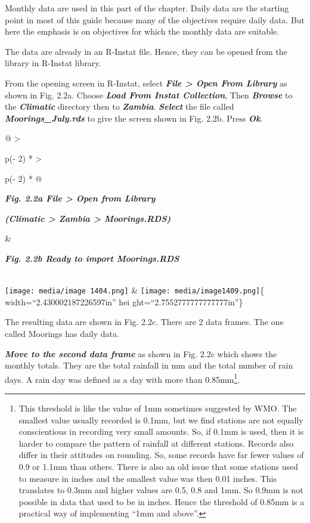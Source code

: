 \documentclass[
  letterpaper,
  DIV=11,
  numbers=noendperiod]{scrreprt}
\begin{document}
Monthly data are used in this part of the chapter. Daily data are the
starting point in most of this guide because many of the objectives
require daily data. But here the emphasis is on objectives for which the
monthly data are suitable.

The data are already in an R-Instat file. Hence, they can be opened from
the library in R-Instat library.

From the opening screen in R-Instat, select \textbf{\emph{File
\textgreater{} Open From Library}} as shown in Fig. 2.2a. Choose
\textbf{\emph{Load From Instat Collection}}, Then \textbf{\emph{Browse}}
to the \textbf{\emph{Climatic}} directory then to
\textbf{\emph{Zambia}}. \textbf{\emph{Select}} the file called
\textbf{\emph{Moorings\_July.rds}} to give the screen shown in Fig.
2.2b. Press \textbf{\emph{Ok}}.

\begin{longtable}[]{@{}
  >{\raggedright\arraybackslash}p{(\columnwidth - 2\tabcolsep) * }
  >{\raggedright\arraybackslash}p{(\columnwidth - 2\tabcolsep) * }@{}}
\toprule\noalign{}
\begin{minipage}[b]{\linewidth}\raggedright
\textbf{\emph{Fig. 2.2a File \textgreater{} Open from Library}}

\textbf{\emph{(Climatic \textgreater{} Zambia \textgreater{}
Moorings.RDS)}}
\end{minipage} & \begin{minipage}[b]{\linewidth}\raggedright
\textbf{\emph{Fig. 2.2b Ready to import Moorings.RDS}}
\end{minipage} \\
\midrule\noalign{}
\endhead
\bottomrule\noalign{}
\endlastfoot
\texttt{[image: media/image 1404.png]}
& \texttt{[image: media/image1409.png]}\{ width=``2.430002187226597in''
hei ght=``2.7552777777777777in''\} \\
\end{longtable}

The resulting data are shown in Fig. 2.2c. There are 2 data frames. The
one called Moorings has daily data.

\textbf{\emph{Move to the second data frame}} as shown in Fig. 2.2c
which shows the monthly totals. They are the total rainfall in mm and
the total number of rain days. A rain day was defined as a day with more
than 0.85mm\footnote{This threshold is like the value of 1mm sometimes
  suggested by WMO. The smallest value usually recorded is 0.1mm, but we
  find stations are not equally conscientious in recording very small
  amounts. So, if 0.1mm is used, then it is harder to compare the
  pattern of rainfall at different stations. Records also differ in
  their attitudes on rounding. So, some records have far fewer values of
  0.9 or 1.1mm than others. There is also an old issue that some
  stations used to measure in inches and the smallest value was then
  0.01 inches. This translates to 0.3mm and higher values are 0.5, 0.8
  and 1mm. So 0.9mm is not possible in data that used to be in inches.
  Hence the threshold of 0.85mm is a practical way of implementing ``1mm
  and above''.}.
\end{document}
